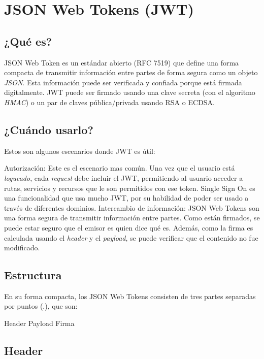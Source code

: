\section[JSON Web Tokens (JWT)]{JSON Web Tokens (JWT)}
\subsection[¿Qué es?]{¿Qué es?}

JSON Web Token es un estándar abierto (RFC 7519) que define una forma compacta de transmitir información entre partes de forma segura como un objeto \textit{JSON}. Esta información puede ser verificada y confiada porque está firmada digitalmente. JWT puede ser firmado usando una clave secreta (con el algoritmo \textit{HMAC}) o un par de claves pública/privada usando RSA o ECDSA.


\subsection[¿Cuándo usarlo?]{¿Cuándo usarlo?}

Estos son algunos escenarios donde JWT es útil:
\begin{outline}
    \1 Autorización: Este es el escenario mas común. Una vez que el usuario está \textit{logueado}, cada \textit{request} debe incluir el JWT, permitiendo al usuario acceder a rutas, servicios y recursos que le son permitidos con ese token. Single Sign On es una funcionalidad que usa mucho JWT, por su habilidad de poder ser usado a través de diferentes dominios.
    \1 Intercambio de información: JSON Web Tokens son una forma segura de transmitir información entre partes. Como están firmados, se puede estar seguro que el emisor es quien dice qué es. Además, como la firma es calculada usando el \textit{header} y el \textit{payload}, se puede verificar que el contenido no fue modificado.
\end{outline}
\subsection[Estructura]{Estructura}


En su forma compacta, los JSON Web Tokens consisten de tres partes separadas por puntos (.), que son:
\begin{outline}
    \2 Header
    \2 Payload
    \2 Firma
\end{outline}

\subsection[Header]{Header}

